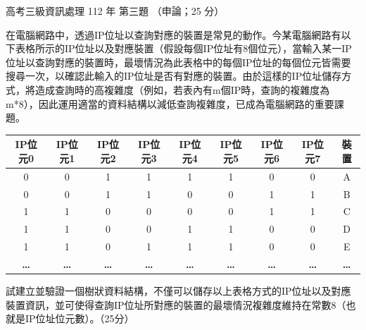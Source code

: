 \begin{pastexam}[label={px:gk3-112-ds-03}]{高考三級資訊處理 112 年 第三題}
（申論；25 分）

在電腦網路中，透過IP位址以查詢對應的裝置是常見的動作。今某電腦網路有以下表格所示的IP位址以及對應裝置（假設每個IP位址有8個位元），當輸入某一IP位址以查詢對應的裝置時，最壞情況為此表格中的每個IP位址的每個位元皆需要搜尋一次，以確認此輸入的IP位址是否有對應的裝置。由於這樣的IP位址儲存方式，將造成查詢時的高複雜度（例如，若表內有m個IP時，查詢的複雜度為m*8），因此運用適當的資料結構以減低查詢複雜度，已成為電腦網路的重要課題。
\begin{center}
\small
\setlength{\tabcolsep}{4pt}
\begin{tabular}{|*{9}{c|}}
\hline
IP位元0 & IP位元1 & IP位元2 & IP位元3 & IP位元4 & IP位元5 & IP位元6 & IP位元7 & 裝置 \\ \hline
0 & 0 & 1 & 1 & 1 & 1 & 0 & 0 & A \\ \hline
0 & 0 & 1 & 1 & 0 & 0 & 1 & 1 & B \\ \hline
1 & 1 & 0 & 0 & 0 & 0 & 1 & 1 & C \\ \hline
1 & 1 & 0 & 0 & 1 & 1 & 0 & 0 & D \\ \hline
1 & 1 & 0 & 1 & 1 & 1 & 0 & 0 & E \\ \hline
\textbf{\dots} & \textbf{\dots} & \textbf{\dots} & \textbf{\dots} & \textbf{\dots} & \textbf{\dots} & \textbf{\dots} & \textbf{\dots} & \textbf{\dots} \\ \hline
\end{tabular}
\end{center}
試建立並驗證一個樹狀資料結構，不僅可以儲存以上表格方式的IP位址以及對應裝置資訊，並可使得查詢IP位址所對應的裝置的最壞情況複雜度維持在常數8（也就是IP位址位元數）。（25分）
\end{pastexam}

